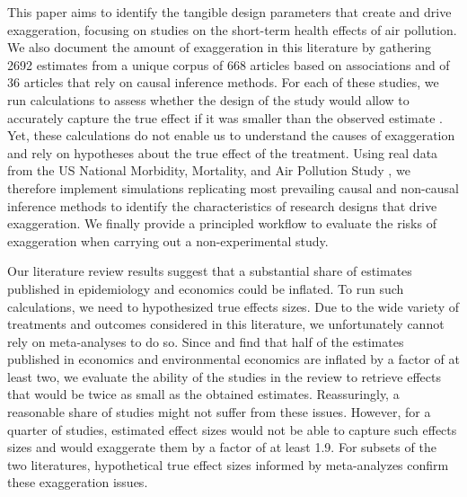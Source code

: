 \documentclass[12pt]{article}
\begin{document}
    This paper aims to identify the tangible design parameters that create and drive exaggeration, focusing on studies on the short-term health effects of air pollution. We also document the amount of exaggeration in this literature by gathering 2692 estimates from a unique corpus of 668 articles based on associations and of 36 articles that rely on causal inference methods. For each of these studies, we run  calculations to assess whether the design of the study would allow to accurately capture the true effect if it was smaller than the observed estimate \citep{gelman_beyond_2014, ioannidis_power_2017, lu_note_2019, timm_retrodesign_2019}. Yet, these calculations do not enable us to understand the causes of exaggeration and rely on hypotheses about the true effect of the treatment. Using real data from the US National Morbidity, Mortality, and Air Pollution Study \citep{samet2000national}, we therefore implement simulations replicating most prevailing causal and non-causal inference methods to identify the characteristics of research designs that drive exaggeration. We finally provide a principled workflow to evaluate the risks of exaggeration when carrying out a non-experimental study.
    
    Our literature review results suggest that a substantial share of estimates published in epidemiology and economics could be inflated. To run such calculations, we need to hypothesized true effects sizes. Due to the wide variety of treatments and outcomes considered in this literature, we unfortunately cannot rely on meta-analyses to do so. Since \cite{ioannidis_power_2017} and \cite{ferraro_featureis_2020} find that half of the estimates published in economics and environmental economics are inflated by a factor of at least two, we evaluate the ability of the studies in the review to retrieve effects that would be twice as small as the obtained estimates. Reassuringly, a reasonable share of studies might not suffer from these issues. However, for a quarter of studies, estimated effect sizes would not be able to capture such  effects sizes and would exaggerate them by a factor of at least 1.9. For subsets of the two literatures, hypothetical true effect sizes informed by meta-analyzes confirm these exaggeration issues.
\end{document}
